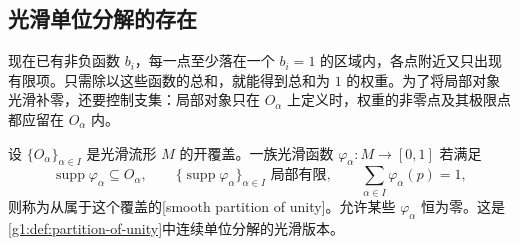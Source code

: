 \subsection{光滑单位分解的存在}
\label{g1:subsec:1203:02}

现在已有非负函数 \(b_i\)，每一点至少落在一个 \(b_i=1\) 的区域内，各点附近又只出现有限项。只需除以这些函数的总和，就能得到总和为 \(1\) 的权重。为了将局部对象光滑补零，还要控制支集：局部对象只在 \(O_\alpha\) 上定义时，权重的非零点及其极限点都应留在 \(O_\alpha\) 内。

\begin{definition}[光滑单位分解]\label{g1:def:smooth-partition-unity}
	设 \(\{O_\alpha\}_{\alpha\in I}\) 是光滑流形 \(M\) 的开覆盖。一族光滑函数 \(\varphi_\alpha:M\to[0,1]\) 若满足
	\[
		\operatorname{supp}\varphi_\alpha\subseteq O_\alpha,\qquad
		\{\operatorname{supp}\varphi_\alpha\}_{\alpha\in I}\text{ 局部有限},\qquad
		\sum_{\alpha\in I}\varphi_\alpha(p)=1,
	\]
	则称为从属于这个覆盖的[smooth partition of unity]。允许某些 \(\varphi_\alpha\) 恒为零。这是\cref{g1:def:partition-of-unity}中连续单位分解的光滑版本。
\end{definition}

